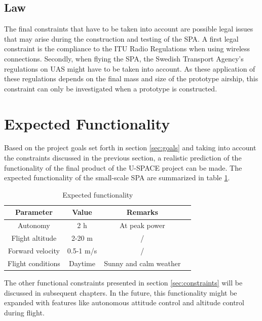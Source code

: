 \subsection{Law}

The final constraints that have to be taken into account are possible legal issues that may arise during the construction and testing of the \ac{SPA}. A first legal constraint is the compliance to the \ac{ITU} Radio Regulations \cite{book:freqalloc} when using wireless connections. Secondly, when flying the \ac{SPA}, the Swedish Transport Agency's regulations on \ac{UAS} \cite{regulations:uas2009} might have to be taken into account. As these application of these regulations depends on the final mass and size of the prototype airship, this constraint can only be investigated when a prototype is constructed.

\section{Expected Functionality}

Based on the project goals set forth in section \ref{sec:goals} and taking into account the constraints discussed in the previous section, a realistic prediction of the functionality of the final product of the \ac{U-SPACE} project can be made. The expected functionality of the small-scale \ac{SPA} are summarized in table \ref{tab:expected}.

\begin{table}[H]
\centering
\caption{Expected functionality}
\label{tab:expected}
\begin{tabular}{c c c c}
\hline
\textbf{Parameter} & \textbf{Value} & \textbf{Remarks}\\ \hline
Autonomy & 2 h & At peak power\\
Flight altitude & 2-20 m & /\\
Forward velocity & 0.5-1 m/s & /\\
Flight conditions & Daytime & Sunny and calm weather\\
\hline
\end{tabular}
\end{table}

\noindent
The other functional constraints presented in section \ref{sec:constraints} will be discussed in subsequent chapters. In the future, this functionality might be expanded with features like autonomous attitude control and altitude control during flight.

